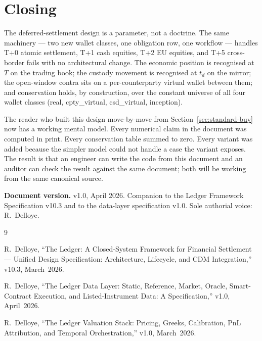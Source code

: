 \documentclass[11pt,a4paper]{article}
\begin{document}
\clearpage
\section*{Closing}

The deferred-settlement design is a parameter, not a doctrine. The same machinery --- two new wallet classes, one obligation row, one workflow --- handles T+0 atomic settlement, T+1 cash equities, T+2 EU equities, and T+5 cross-border fails with no architectural change. The economic position is recognised at $T$ on the trading book; the custody movement is recognised at $t_d$ on the mirror; the open-window contra sits on a per-counterparty virtual wallet between them; and conservation holds, by construction, over the constant universe of all four wallet classes (real, cpty\_virtual, csd\_virtual, inception).

The reader who built this design move-by-move from Section~\ref{sec:standard-buy} now has a working mental model. Every numerical claim in the document was computed in print. Every conservation table summed to zero. Every variant was added because the simpler model could not handle a case the variant exposes. The result is that an engineer can write the code from this document and an auditor can check the result against the same document; both will be working from the same canonical source.

\vspace{2em}

\noindent\textbf{Document version.} v1.0, April 2026. Companion to the Ledger Framework Specification v10.3 and to the data-layer specification v1.0. Sole authorial voice: R.~Delloye.

\begin{thebibliography}{9}

R.~Delloye, ``The Ledger: A Closed-System Framework for Financial Settlement --- Unified Design Specification: Architecture, Lifecycle, and CDM Integration,'' v10.3, March~2026.

R.~Delloye, ``The Ledger Data Layer: Static, Reference, Market, Oracle, Smart-Contract Execution, and Listed-Instrument Data: A Specification,'' v1.0, April~2026.

R.~Delloye, ``The Ledger Valuation Stack: Pricing, Greeks, Calibration, PnL Attribution, and Temporal Orchestration,'' v1.0, March~2026.

\end{thebibliography}
\end{document}
